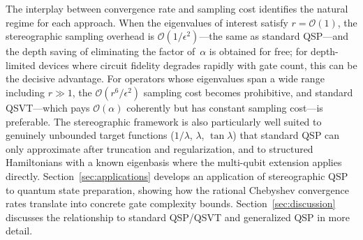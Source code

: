 
The interplay between convergence rate and sampling cost identifies
the natural regime for each approach.  When the eigenvalues of
interest satisfy $r = \mathcal{O}(1)$, the stereographic sampling
overhead is $\mathcal{O}(1/\epsilon^2)$---the same as standard
QSP---and the depth saving of eliminating the factor of~$\alpha$
is obtained for free; for depth-limited devices where circuit
fidelity degrades rapidly with gate count, this can be the
decisive advantage.  For operators whose eigenvalues span a wide
range including $r \gg 1$, the $\mathcal{O}(r^6/\epsilon^2)$
sampling cost becomes prohibitive, and standard QSVT---which pays
$\mathcal{O}(\alpha)$ coherently but has constant sampling
cost---is preferable.  The stereographic framework is also
particularly well suited to genuinely unbounded target functions
($1/\lambda$, $\lambda$, $\tan\lambda$) that standard QSP can
only approximate after truncation and regularization, and to
structured Hamiltonians with a known eigenbasis where the
multi-qubit extension applies directly.
Section~\ref{sec:applications} develops an application of
stereographic QSP to quantum state preparation, showing how the
rational Chebyshev convergence rates translate into concrete gate
complexity bounds.  Section~\ref{sec:discussion} discusses the
relationship to standard QSP/QSVT and generalized QSP in more
detail.
